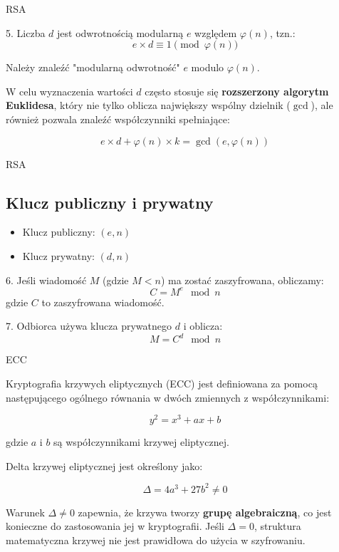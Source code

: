\begin{frame}{RSA}
   
    5. Liczba \( d \) jest odwrotnością modularną \( e \) względem \( \varphi(n) \), tzn.:
    \[
    e \times d \equiv 1 \pmod{\varphi(n)}
    \]
   
    Należy znaleźć "modularną odwrotność" \( e \) modulo \( \varphi(n) \).

    
    W celu wyznaczenia wartości \( d \) często stosuje się \textbf{rozszerzony algorytm Euklidesa}, który nie tylko oblicza największy wspólny dzielnik (\(\gcd\)), ale również pozwala znaleźć współczynniki spełniające:

    
         \[
        e \times d + \varphi(n) \times k = \gcd(e, \varphi(n))
   \]
       
\end{frame}

\begin{frame}{RSA}
   


   
    \subsection{Klucz publiczny i prywatny}
    \begin{itemize}
        \item Klucz publiczny: \( (e, n) \)
        \item Klucz prywatny: \( (d, n) \)
    \end{itemize}

    
    6. Jeśli wiadomość \( M \) (gdzie \( M < n \)) ma zostać zaszyfrowana, obliczamy:
    \[
    C = M^e \mod n
    \]
    gdzie \( C \) to zaszyfrowana wiadomość.

   
    7. Odbiorca używa klucza prywatnego \( d \) i oblicza:
    \[
    M = C^d \mod n
    \]
\end{frame}


\begin{frame}{ECC}


Kryptografia krzywych eliptycznych (ECC) jest definiowana za pomocą następującego ogólnego równania w dwóch zmiennych z współczynnikami:

\[
    y^2 = x^3 + ax + b
\]

gdzie $a$ i $b$ są współczynnikami krzywej eliptycznej.

Delta krzywej eliptycznej jest określony jako:

\[
    \Delta = 4a^3 + 27b^2 \neq 0
\]

Warunek $\Delta \neq 0$ zapewnia, że krzywa tworzy \textbf{grupę algebraiczną}, co jest konieczne do zastosowania jej w kryptografii. Jeśli $\Delta = 0$, struktura matematyczna krzywej nie jest prawidłowa do użycia w szyfrowaniu.
\end{frame}

